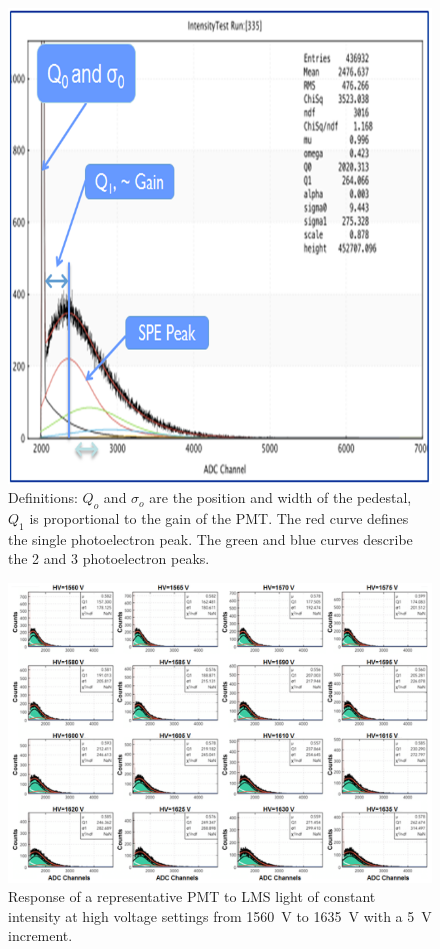 \begin{figure}[!h]
    \centering
    \includegraphics[width=1.0\linewidth,trim={0.0cm 0.0cm 0.0cm 0.0cm},clip]{images/WILLIAM_1.png}
    \caption{Definitions: $Q_o$ and $\sigma_o$ are the position and width of the pedestal, $Q_ 1$ is proportional
      to the gain of the PMT. The red curve defines the single photoelectron peak. The green and blue curves describe
      the 2 and 3 photoelectron peaks.}
    \label{fig:WILLIAM_1}
\end{figure}

\begin{figure}[ht]
\centering
\includegraphics[width=0.99\linewidth]{images/WILLIAM_2_NEW.png}
\caption{Response of a representative PMT to LMS light of constant intensity at high voltage settings from 1560~V
  to 1635~V with a 5~V increment.}
\label{fig:WILLIAM_2_NEW}
\end{figure}

